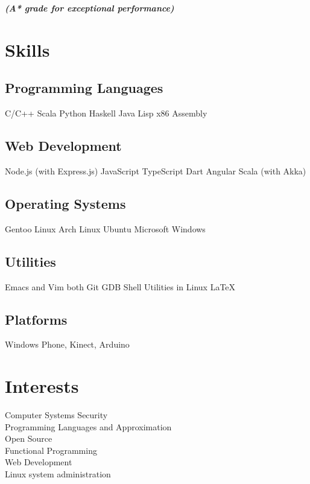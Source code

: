 \documentclass[a4paper]{deedy-resume} %
\begin{document}
\begin{minipage}[t]{0.33\textwidth}
{\footnotesize \textit{\textbf{(A* grade for exceptional performance) }}} \\

\sectionspace

\section{Skills}

\subsection{Programming Languages}
C/C++ \textbullet{} Scala \textbullet{} Python \textbullet{} Haskell
\textbullet{} Java \textbullet{} Lisp \textbullet{} x86 Assembly

\sectionspace

\subsection{Web Development}
Node.js (with Express.js) \textbullet{} JavaScript \textbullet{} TypeScript
\textbullet{} Dart \textbullet{} Angular \textbullet Scala (with Akka) \\

\sectionspace

\subsection{Operating Systems}
Gentoo Linux \textbullet{} Arch Linux \textbullet{} Ubuntu \textbullet{}
Microsoft Windows

\sectionspace

\subsection{Utilities}
Emacs and Vim both \textbullet{} Git \textbullet{} GDB \textbullet{}
Shell Utilities in Linux \textbullet{} LaTeX

\sectionspace

\subsection{Platforms}
Windows Phone, Kinect, Arduino

\section{Interests}
Computer Systems Security\\
Programming Languages and Approximation\\
Open Source\\
Functional Programming\\
Web Development\\
Linux system administration

\end{minipage}
\end{document}
